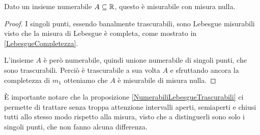 \begin{proposition}\label{NumerabiliLebesgueTrascurabili}
	Dato un insieme numerabile $A\subseteq\mathbb R$, questo è misurabile con misura nulla.
\end{proposition}
\begin{proof}
	I singoli punti, essendo banalmente trascurabili, sono Lebesgue misurabili visto che la misura di Lebesgue è completa, come mostrato in \cref{LebesgueCompletezza}.
	
	L'insieme $A$ è però numerabile, quindi unione numerabile di singoli punti, che sono trascurabili. Perciò è trascurabile a sua volta $A$ e sfruttando ancora la completezza di $m_1$ otteniamo che $A$ è misurabile di misura nulla.
\end{proof}
\begin{remark}
	È importante notare che la proposizione \cref{NumerabiliLebesgueTrascurabili} ci permette di trattare senza troppa attenzione intervalli aperti, semiaperti e chiusi tutti allo stesso modo rispetto alla misura, visto che a distinguerli sono solo i singoli punti, che non fanno alcuna differenza.
\end{remark}





